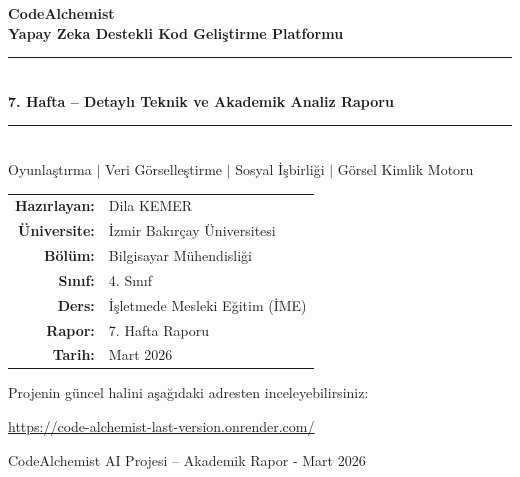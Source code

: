 \documentclass[12pt,a4paper]{article}
\begin{document}
\sloppy

\begin{titlepage}
  \centering
  \vspace*{2cm}

  {\Huge\bfseries\color{keywordblue} CodeAlchemist}\\[0.8em]
  {\large\bfseries Yapay Zeka Destekli Kod Geliştirme Platformu}\\[2em]

  \rule{\textwidth}{1pt}\\[0.8em]
  {\LARGE\bfseries 7. Hafta -- Detaylı Teknik ve Akademik Analiz Raporu}\\[0.5em]
  \rule{\textwidth}{1pt}\\[2em]

  {\large Oyunlaştırma $\mid$ Veri Görselleştirme $\mid$ Sosyal İşbirliği $\mid$ Görsel Kimlik Motoru}

  \vspace{3em}

  \begin{tabular}{rl}
    \textbf{Hazırlayan:}   & Dila KEMER \\[0.4em]
    \textbf{Üniversite:}   & İzmir Bakırçay Üniversitesi \\[0.4em]
    \textbf{Bölüm:}        & Bilgisayar Mühendisliği \\[0.4em]
    \textbf{Sınıf:}        & 4. Sınıf \\[0.4em]
    \textbf{Ders:}         & İşletmede Mesleki Eğitim (İME) \\[0.4em]
    \textbf{Rapor:}        & 7. Hafta Raporu \\[0.4em]
    \textbf{Tarih:}        & Mart 2026 \\
  \end{tabular}

  \vspace{3em}

  \begin{ozetbox}
    Projenin güncel halini aşağıdaki adresten inceleyebilirsiniz:\\[0.6em]
    \begin{center}
      \large\href{https://code-alchemist-last-version.onrender.com/}%
        {https://code-alchemist-last-version.onrender.com/}
    \end{center}
  \end{ozetbox}

  \vfill
  {\small\color{gray} CodeAlchemist AI Projesi -- Akademik Rapor - Mart 2026}
\end{titlepage}
\end{document}
